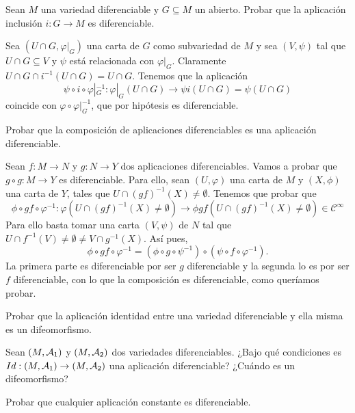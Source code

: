 \documentclass[twoside]{article}
\begin{document}
\newpage

\begin{ejercicio}{2}
Sean $M$ una variedad diferenciable y $G \subseteq M$ un abierto. Probar que la
aplicación inclusión $i : G \to M$ es diferenciable.
\end{ejercicio}
\begin{solucion}
Sea $(U\cap G,\varphi|_G)$ una carta de $G$ como subvariedad de $M$ y sea $(V,\psi)$ tal que $U\cap G\subseteq V$ y $\psi$ está relacionada con $\varphi|_G$. Claramente $U\cap G\cap i^{-1}(U\cap G)=U\cap G$. Tenemos que la aplicación 
$$\psi\circ i\circ\varphi|_G^{-1}:\varphi|_G(U\cap G)\to \psi i(U\cap G)=\psi(U\cap G)$$
coincide con $\varphi\circ\varphi|_G^{-1}$, que por hipótesis es diferenciable.
\end{solucion}

\newpage

\begin{ejercicio}{3}
Probar que la composición de aplicaciones diferenciables es una aplicación
diferenciable.
\end{ejercicio}
\begin{solucion}
Sean $f:M\to N$ y $g:N\to Y$ dos aplicaciones diferenciables. Vamos a probar que $g\circ g:M\to Y$ es diferenciable. Para ello, sean $(U,\varphi)$ una carta de $M$ y $(X,\phi)$ una carta de $Y$, tales que $U\cap (gf)^{-1}(X)\neq\emptyset$. Tenemos que probar que
$$\phi\circ gf\circ \varphi^{-1}:\varphi(U\cap (gf)^{-1}(X)\neq\emptyset)\to \phi gf(U\cap (gf)^{-1}(X)\neq\emptyset)\in\mathcal{C}^\infty$$
Para ello basta tomar una carta $(V,\psi)$ de $N$ tal que $U\cap f^{-1}(V)\neq\emptyset\neq V\cap g^{-1}(X)$. Así pues,
$$\phi\circ gf\circ \varphi^{-1}=(\phi\circ g\circ\psi^{-1})\circ(\psi\circ f\circ \varphi^{-1}).$$
La primera parte es diferenciable por ser $g$ diferenciable y la segunda lo es por ser $f$ diferenciable, con lo que la composición es diferenciable, como queríamos probar.
\end{solucion}

\newpage

\begin{ejercicio}{4}
Probar que la aplicación identidad entre una variedad diferenciable y ella
misma es un difeomorfismo.
\end{ejercicio}
\begin{solucion}

\end{solucion}

\newpage

\begin{ejercicio}{5}
Sean $(M,\mathcal{A}_1)$ y $(M,\mathcal{A}_2)$ dos variedades diferenciables. ¿Bajo qué condiciones
es $Id : (M,\mathcal{A}_1) \to (M,\mathcal{A}_2)$ una aplicación diferenciable? ¿Cuándo es un
difeomorfismo?
\end{ejercicio}
\begin{solucion}

\end{solucion}

\newpage

\begin{ejercicio}{6}
Probar que cualquier aplicación constante es diferenciable.
\end{ejercicio}
\begin{solucion}

\end{solucion}
\end{document}
